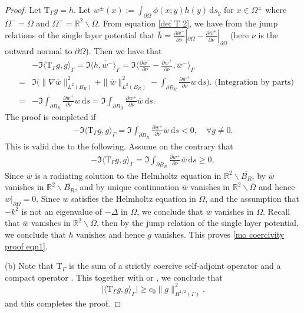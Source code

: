 \documentclass[final]{siamltex}
\newcommand{\ind}{\,\mbox{d}}
\begin{document}
\begin{proof}
Let $\mathrm{T}_\Gamma g=h$. Let $w^\pm(x):=\int_{\partial \Omega} \overline{ \phi(x;y)} h(y) \ind s_y$ for $x  \in  \Omega^\pm$ where $\Omega^-=\Omega$ and $\Omega^+=\mathbb{R}^2\backslash \overline{\Omega}$. From equation \eqref{def T 2}, we have from the jump relations of the single layer potential that  $\overline{h}= \frac{\partial \overline{w}^-}{\partial \nu}|_{\partial \Omega}-\frac{\partial \overline{w}^+}{\partial \nu}|_{\partial \Omega}$ (here $\nu$ is the outward normal to $\partial \Omega$). Then we have that
\begin{eqnarray*}
&&-\Im \langle  \mathrm{T}_\Gamma g,g \rangle_\Gamma = \Im \overline{ \langle h,w^- \rangle_\Gamma }= \Im  \langle   \frac{\partial \overline{w}^-}{\partial \nu}-\frac{\partial \overline{w}^+}{\partial \nu}  ,\overline{w}^- \rangle_\Gamma \\
&=& \Im  \Big( \|\nabla \overline{w} \|^2_{L^2(B_R)} +   \|\overline{w}   \| ^2_{L^2(B_R)} - \int_{\partial B_R} \frac{\partial \overline{w}^+}{\partial \nu}  {w} \ind s \Big).  \mbox{ (Integration by parts)} \\
&=& - \Im  \int_{\partial B_R} \frac{\partial \overline{w}^+}{\partial \nu}  {w} \ind s = \Im  \int_{\partial B_R} \frac{\partial {w}^+}{\partial \nu}  \overline{w} \ind s .
\end{eqnarray*}
The proof is completed if
\begin{eqnarray} \label{mo coercivity proof eqn2}
-\Im \langle  \mathrm{T}_\Gamma g,g \rangle_\Gamma = \Im  \int_{\partial B_R} \frac{\partial {w}^+}{\partial \nu}  \overline{w} \ind s <0, \quad \forall g\not=0.
\end{eqnarray}
This is valid due to the following. Assume on the contrary that
\begin{eqnarray*}
-\Im \langle  \mathrm{T}_\Gamma g,g \rangle_\Gamma = \Im  \int_{\partial B_R} \frac{\partial {w}^+}{\partial \nu}  \overline{w} \ind s \ge 0,
\end{eqnarray*}
Since $\overline{w}$ is a radiating solution to the Helmholtz equation in $\mathbb{R}^2 \backslash \overline{B_R}$, by \cite[Theorem 2.13]{CK} $\overline{w}$ vanishes in $\mathbb{R}^2 \backslash \overline{B_R}$, and by unique continuation $\overline{w}$ vanishes in $\mathbb{R}^2 \backslash \overline{\Omega}$ and hence $w|_{\partial \Omega}=0$. Since ${w}$ satisfies the Helmholtz equation in $\Omega$, and the assumption that $-k^2$ is not an eigenvalue of $-\Delta$ in $\Omega$, we conclude that $w$ vanishes in $\Omega$. Recall that $\overline{w}$ vanishes in $\mathbb{R}^2 \backslash \overline{\Omega}$, then by the jump relation of the single layer potential, we conclude that $h$ vanishes and hence $g$ vanishes. This proves \eqref{mo coercivity proof eqn1}.

(b) Note that $\mathrm{T}_\Gamma$ is the sum of a strictly coercive self-adjoint operator and a compact operator \cite[Lemma 5.38]{CK}. This together with \cite[Lemma 7.28]{CaCo} or \cite[Lemma 5.37]{CK}, we conclude that
\begin{equation*}
\big| \langle  \mathrm{T}_\Gamma g,g \rangle_\Gamma \big| \ge c_0 \|g\|^2_{H^{1/2}(\Gamma)}.
\end{equation*}
and this completes the proof.
\end{proof}
\end{document}
